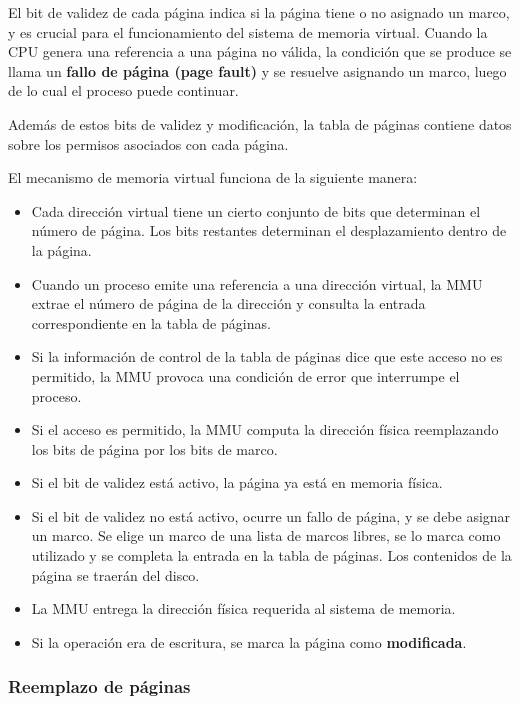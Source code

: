 \documentclass[spanish,a4paper,]{article}
\providecommand{\tightlist}{%
  \setlength{\itemsep}{0pt}\setlength{\parskip}{0pt}}
\begin{document}
El bit de validez de cada página indica si la página tiene o no asignado
un marco, y es crucial para el funcionamiento del sistema de memoria
virtual. Cuando la CPU genera una referencia a una página no válida, la
condición que se produce se llama un \textbf{fallo de página (page
fault)} y se resuelve asignando un marco, luego de lo cual el proceso
puede continuar.

Además de estos bits de validez y modificación, la tabla de páginas
contiene datos sobre los permisos asociados con cada página.

El mecanismo de memoria virtual funciona de la siguiente manera:

\begin{itemize}
\tightlist
\item
  Cada dirección virtual tiene un cierto conjunto de bits que determinan
  el número de página. Los bits restantes determinan el desplazamiento
  dentro de la página.
\item
  Cuando un proceso emite una referencia a una dirección virtual, la MMU
  extrae el número de página de la dirección y consulta la entrada
  correspondiente en la tabla de páginas.
\item
  Si la información de control de la tabla de páginas dice que este
  acceso no es permitido, la MMU provoca una condición de error que
  interrumpe el proceso.
\item
  Si el acceso es permitido, la MMU computa la dirección física
  reemplazando los bits de página por los bits de marco.
\item
  Si el bit de validez está activo, la página ya está en memoria física.
\item
  Si el bit de validez no está activo, ocurre un fallo de página, y se
  debe asignar un marco. Se elige un marco de una lista de marcos
  libres, se lo marca como utilizado y se completa la entrada en la
  tabla de páginas. Los contenidos de la página se traerán del disco.
\item
  La MMU entrega la dirección física requerida al sistema de memoria.
\item
  Si la operación era de escritura, se marca la página como
  \textbf{modificada}.
\end{itemize}

\hypertarget{reemplazo-de-puxe1ginas}{%
\subsubsection{Reemplazo de páginas}\label{reemplazo-de-puxe1ginas}}
\end{document}
